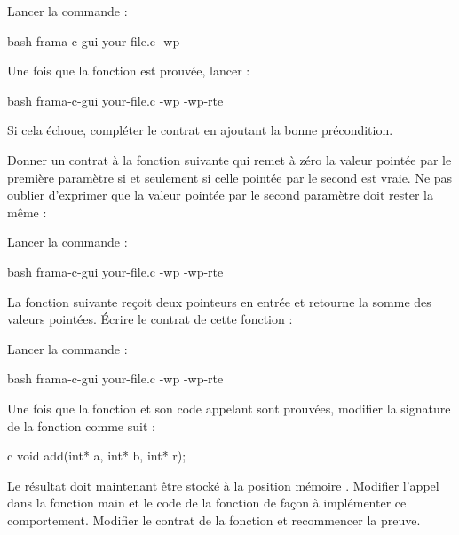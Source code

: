 

Lancer la commande :


\begin{CodeBlock}{bash}
frama-c-gui your-file.c -wp 
\end{CodeBlock}


Une fois que la fonction est prouvée, lancer :

\begin{CodeBlock}{bash}
frama-c-gui your-file.c -wp -wp-rte
\end{CodeBlock}


Si cela échoue, compléter le contrat en ajoutant la bonne précondition.




Donner un contrat à la fonction suivante qui remet à zéro la valeur
pointée par le première paramètre si et seulement si celle pointée par le
second est vraie. Ne pas oublier d'exprimer que la valeur pointée par le second
paramètre doit rester la même :




Lancer la commande :


\begin{CodeBlock}{bash}
frama-c-gui your-file.c -wp -wp-rte
\end{CodeBlock}




La fonction suivante reçoit deux pointeurs en entrée et retourne la
somme des valeurs pointées. Écrire le contrat de cette fonction :




Lancer la commande :


\begin{CodeBlock}{bash}
frama-c-gui your-file.c -wp -wp-rte
\end{CodeBlock}


Une fois que la fonction et son code appelant sont prouvées, modifier
la signature de la fonction comme suit :


\begin{CodeBlock}{c}
void add(int* a, int* b, int* r);
\end{CodeBlock}


Le résultat doit maintenant être stocké à la position mémoire .
Modifier l'appel dans la fonction main et le code de la fonction de façon à
implémenter ce comportement. Modifier le contrat de la fonction
 et recommencer la preuve.



